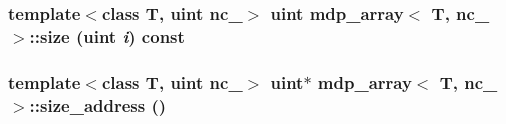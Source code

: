 \label{classmdp__array_a236c3497ad1e959070836746302448e8}
\hypertarget{classmdp__array_adf2fd9006ccac4f6b1365d4018f3e513}{
\subsubsection[{size}]{\setlength{\rightskip}{0pt plus 5cm}template$<$class T, uint nc\_\-$>$ {\bf uint} {\bf mdp\_\-array}$<$ T, nc\_\- $>$::size ({\bf uint} {\em i}) const}}
\label{classmdp__array_adf2fd9006ccac4f6b1365d4018f3e513}
\hypertarget{classmdp__array_aee0c0b97d3f8bb9d3f8ecedb77d14e6d}{
\subsubsection[{size\_\-address}]{\setlength{\rightskip}{0pt plus 5cm}template$<$class T, uint nc\_\-$>$ {\bf uint}$\ast$ {\bf mdp\_\-array}$<$ T, nc\_\- $>$::size\_\-address ()}}
\label{classmdp__array_aee0c0b97d3f8bb9d3f8ecedb77d14e6d}


